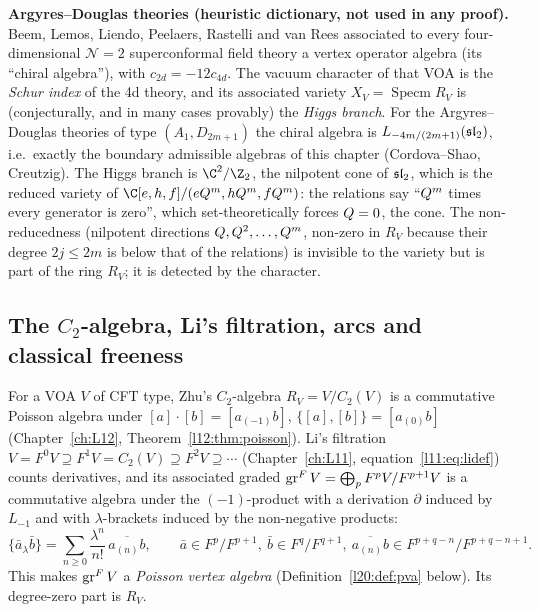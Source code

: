 \begin{physics}
\textbf{Argyres--Douglas theories (heuristic dictionary, not used in any proof).} Beem, Lemos, Liendo,
Peelaers, Rastelli and van Rees associated to every four-dimensional $\mathcal N=2$ superconformal field
theory a vertex operator algebra (its ``chiral algebra''), with $c_{2d}=-12c_{4d}$. The vacuum character of
that VOA is the \emph{Schur index} of the 4d theory, and its associated variety
$X_V=\operatorname{Specm}R_V$ is (conjecturally, and in many cases provably) the \emph{Higgs branch}.
For the Argyres--Douglas theories of type $(A_1,D_{2m+1})$ the chiral algebra is
$L_{-4m/(2m+1)}(\mathfrak{sl}_2)$, i.e.\ exactly the boundary admissible algebras of this chapter (Cordova--Shao,
Creutzig). The Higgs branch is $\C^2/\Z_2$, the nilpotent cone of $\mathfrak{sl}_2$, which is the reduced variety
of $\C[e,h,f]/(e\ltwentyQ^m,h\ltwentyQ^m,f\ltwentyQ^m)$: the relations say ``$Q^m$ times every
generator is zero'', which set-theoretically forces $Q=0$, the cone. The non-reducedness (nilpotent
directions $Q,Q^2,\dots,Q^{m}$, non-zero in $R_V$ because their degree $2j\le2m$ is below that of the relations) is invisible to the variety but
is part of the ring $R_V$; it is detected by the character.
\end{physics}

\subsection{The $C_2$-algebra, Li's filtration, arcs and classical freeness}

For a VOA $V$ of CFT type, Zhu's $C_2$-algebra $R_V=V/C_2(V)$ is a commutative Poisson algebra under
$[a]\cdot[b]=[a_{(-1)}b]$, $\{[a],[b]\}=[a_{(0)}b]$ (Chapter~\ref{ch:L12}, Theorem~\ref{l12:thm:poisson}).
Li's filtration $V=F^0V\supseteq F^1V=C_2(V)\supseteq F^2V\supseteq\cdots$ (Chapter~\ref{ch:L11},
equation~\eqref{l11:eq:lidef}) counts derivatives, and its associated graded
$\operatorname{gr}^F V=\bigoplus_pF^pV/F^{p+1}V$ is a commutative algebra under the $(-1)$-product with a derivation
$\partial$ induced by $L_{-1}$ and with $\lambda$-brackets induced by the non-negative products:
\begin{equation}\label{l20:eq:grbracket}
\{\bar a_\lambda\bar b\}=\sum_{n\ge0}\frac{\lambda^n}{n!}\,\overline{a_{(n)}b},\qquad
\bar a\in F^p/F^{p+1},\ \bar b\in F^q/F^{q+1},\ \overline{a_{(n)}b}\in F^{p+q-n}/F^{p+q-n+1}.
\end{equation}
This makes $\operatorname{gr}^F V$ a \emph{Poisson vertex algebra} (Definition~\ref{l20:def:pva} below). Its degree-zero
part is $R_V$.


